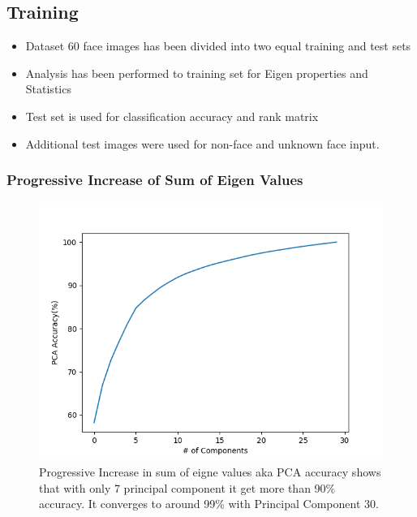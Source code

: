 \documentclass[11pt]{beamer}
\begin{document}
\subsection{Training}
\begin{frame}
\begin{itemize}
  \item Dataset 60 face images has been divided into two equal training and test sets
  \item Analysis has been performed to training set for Eigen properties and Statistics
  \item Test set is used for classification accuracy and rank matrix
  \item Additional test images were used for non-face and unknown face input.
\end{itemize}
\end{frame}
\begin{frame}
\frametitle{Progressive Increase of Sum of Eigen Values}
\begin{figure}
\includegraphics[width=.8\textwidth]{PCA_accuracy.png}
\caption{Progressive Increase in sum of eigne values aka PCA accuracy shows that with only 7 principal 
component it get more than 90\% accuracy. It converges to around 99\% with Principal Component 30.}
\end{figure}
\end{frame}
\end{document}
